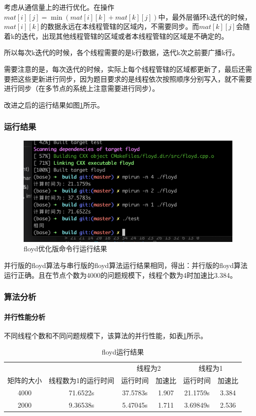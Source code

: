 \documentclass[10pt]{article}
\begin{document}
考虑从通信量上的进行优化。在操作$mat[i][j] = \min(mat[i][k] + mat[k][j])$中，最外层循环k迭代的时候，$mat[i][k]$的数据永远在本线程管辖的区域内，不需要同步。而$mat[k][j]$会随着k的迭代，出现其他线程管辖的区域或者本线程管辖的区域是不确定的。

所以每次k迭代的时候，各个线程需要的是k行数据，迭代k次之前要广播k行。

需要注意的是，每次迭代的时候，实际上每个线程管辖的区域都更新了，最后还需要把这些更新进行同步，因为题目要求的是线程依次按照顺序分别写入，就不需要进行同步（在多节点的系统上注意需要进行同步）。

改进之后的运行结果如图\ref{floyd优化版命令行运行结果}所示。

\subsubsection{运行结果}

\begin{figure}[htbp]
    \centering
    \includegraphics[width=.6\textwidth]{assets/floyd第二版命令行运行结果.png}
    \caption{floyd优化版命令行运行结果}
    \label{floyd优化版命令行运行结果}
\end{figure}

并行版的floyd算法与串行版的floyd算法运行结果相同，得出：并行版的floyd算法运行正确。且在节点个数为4000的问题规模下，线程个数为4时加速比3.384。

\subsubsection{算法分析}

\paragraph{并行性能分析}

不同线程个数和不同问题规模下，该算法的并行性能，如表\ref{floyd_table}所示。


\begin{table}[htbp]
    \centering
    \caption{floyd运行结果}
        \begin{tabular}{|c|c|c|c|c|c|}
        \hline
          &  & \multicolumn{2}{|c|}{线程为2} & \multicolumn{2}{|c|}{线程为1} \\ \cline{3-6}
        矩阵的大小 & 线程数为1的运行时间 & 运行时间 & 加速比 & 运行时间 & 加速比 \\
        \hline
        4000 & 71.6522s & 37.5783s & 1.907 & 21.1759s & 3.384 \\
        \hline
        2000 & 9.36538s & 5.47045s & 1.711 & 3.69849s & 2.536 \\
        \hline
        \end{tabular}
    \label{floyd_table}
\end{table}
\end{document}
